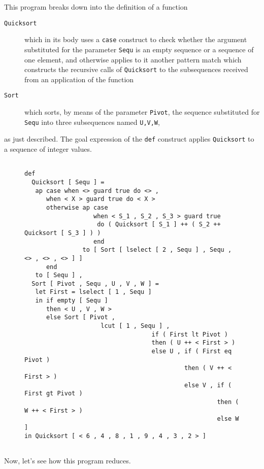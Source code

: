 This program breaks down into the definition of a function
\begin{description}
\item[{\tt Quicksort}] which in its body uses a {\tt case} construct to check 
whether the argument substituted for the parameter {\tt Sequ} is 
an empty sequence or a sequence of one element, and otherwise applies to it 
another pattern match which constructs the recursive calls of {\tt Quicksort} to the 
subsequences received from an application of the function
\item[{\tt Sort}] which sorts, by means of the parameter {\tt Pivot}, the
sequence substituted for {\tt Sequ} into three subsequences named {\tt U,V,W},
\end{description}
as just described. The goal expression of the {\tt def} construct applies
{\tt Quicksort} to a sequence of integer values.
\begin{figure}
\begin{verbatim}

def 
  Quicksort [ Sequ ] =
   ap case when <> guard true do <> ,
      when < X > guard true do < X >
      otherwise ap case 
                   when < S_1 , S_2 , S_3 > guard true
                    do ( Quicksort [ S_1 ] ++ ( S_2 ++ Quicksort [ S_3 ] ) )
                   end
                to [ Sort [ lselect [ 2 , Sequ ] , Sequ , <> , <> , <> ] ]
      end
   to [ Sequ ] ,
  Sort [ Pivot , Sequ , U , V , W ] =
   let First = lselect [ 1 , Sequ ]
   in if empty [ Sequ ]
      then < U , V , W >
      else Sort [ Pivot ,
                     lcut [ 1 , Sequ ] ,
                                   if ( First lt Pivot )
                                   then ( U ++ < First > )
                                   else U , if ( First eq Pivot )
                                            then ( V ++ < First > )
                                            else V , if ( First gt Pivot )
                                                     then ( W ++ < First > )
                                                     else W ]
in Quicksort [ < 6 , 4 , 8 , 1 , 9 , 4 , 3 , 2 > ]
 
\end{verbatim}
\end{figure}

Now, let's see how this program reduces.

